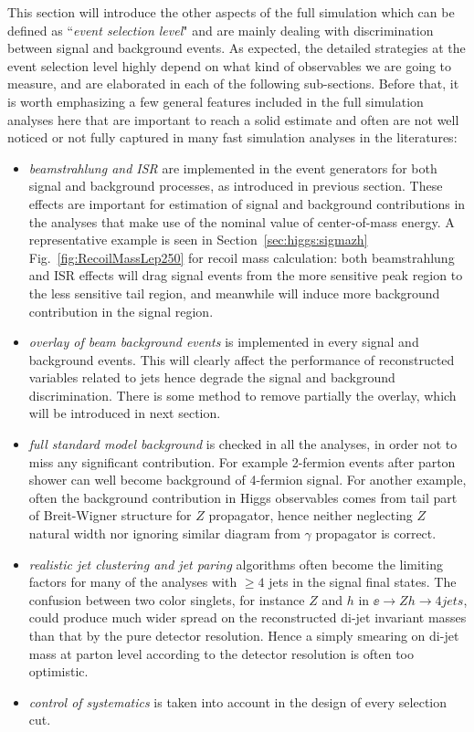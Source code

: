 This section will introduce the other aspects of the full simulation which can be
defined as ``{\it event selection level}" and are mainly dealing with discrimination 
between signal and background events. As expected, the detailed strategies 
at the event selection level highly depend on what kind of observables we are going to
measure, and are elaborated in each of the following sub-sections. Before that, it is worth
emphasizing a few general features included in the full simulation analyses here
that are important to reach a solid estimate
and often are not well noticed or not fully captured in 
many fast simulation analyses in the literatures:
\begin{itemize}
\item {\it beamstrahlung and ISR}
are implemented in the event generators for both signal and background processes,
as introduced in previous section. These effects are important for estimation of 
signal and background contributions in the analyses that make use of the 
nominal value of center-of-mass energy. A representative example is seen in
Section~\ref{sec:higgs:sigmazh} Fig.~\ref{fig:RecoilMassLep250} for recoil
mass calculation: both beamstrahlung and ISR effects will drag signal events
from the more sensitive peak region to the less sensitive tail region, and meanwhile
will induce more background contribution in the signal region.
\item {\it overlay of beam background events} is implemented in every signal 
and background events. This will clearly affect the performance of 
reconstructed variables related to jets hence degrade the signal and background
discrimination. There is some method to remove partially the overlay, which will 
be introduced in next section. 
\item {\it full standard model background} is checked in all the analyses, 
in order not to miss any significant contribution. For example 2-fermion 
events after parton shower can well become background of 4-fermion signal.
For another example, often the background contribution in Higgs observables
comes from tail part of Breit-Wigner structure for $Z$ propagator, hence neither neglecting 
$Z$ natural width nor ignoring similar diagram from $\gamma$ propagator is correct.
\item {\it realistic jet clustering and jet paring} algorithms often become the 
limiting factors for many of the analyses with $\ge 4$ jets in the signal final states.
The confusion between two color singlets, for instance $Z$ and $h$ in $\ee\to Zh\to 4 jets$,
could produce much wider spread on the reconstructed di-jet invariant masses 
than that by the pure detector resolution. Hence a simply smearing on di-jet mass
at parton level according to the detector resolution is often too optimistic. 
\item {\it control of systematics} is taken into account in the design of every
selection cut.
\end{itemize}

